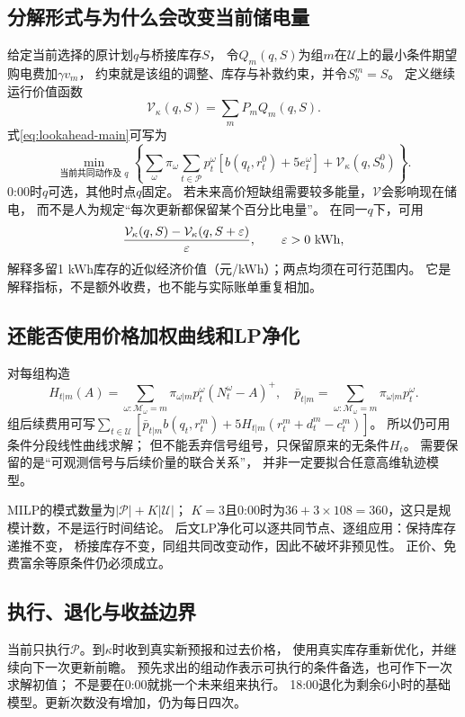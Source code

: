 \documentclass[UTF8,11pt]{ctexart}
\begin{document}
\subsection{分解形式与为什么会改变当前储电量}
给定当前选择的原计划$q$与桥接库存$S$，
令$Q_m(q,S)$为组$m$在$\mathcal U$上的最小条件期望购电费加$\gamma v_m$，
约束就是该组的调整、库存与补救约束，并令$S_b^m=S$。
定义继续运行价值函数
\begin{equation}
 \mathcal V_\kappa(q,S)=\sum_mP_m Q_m(q,S).
\end{equation}
式\eqref{eq:lookahead-main}可写为
\begin{equation}
 \min_{\text{当前共同动作及 }q}
 \left\{\sum_\omega\pi_\omega\sum_{t\in\mathcal P}
  p_t^\omega[b(q_t,r_t^0)+5e_t^\omega]
       +\mathcal V_\kappa(q,S_b^0)\right\}.
\end{equation}
0:00时$q$可选，其他时点$q$固定。
若未来高价短缺组需要较多能量，$\mathcal V$会影响现在储电，
而不是人为规定“每次更新都保留某个百分比电量”。
在同一$q$下，可用
\begin{equation}
 \frac{\mathcal V_\kappa(q,S)-\mathcal V_\kappa(q,S+\varepsilon)}
      {\varepsilon},\qquad \varepsilon>0\ {\rm kWh},
\end{equation}
解释多留1 kWh库存的近似经济价值（元/kWh）；两点均须在可行范围内。
它是解释指标，不是额外收费，也不能与实际账单重复相加。

\subsection{还能否使用价格加权曲线和LP净化}
对每组构造
\begin{equation}
 H_{t|m}(A)=\sum_{\omega:\mathcal M_\omega=m}
             \pi_{\omega|m}p_t^\omega(N_t^\omega-A)^+,\quad
 \bar p_{t|m}=\sum_{\omega:\mathcal M_\omega=m}
             \pi_{\omega|m}p_t^\omega .
\end{equation}
组后续费用可写$\sum_{t\in\mathcal U}
[\bar p_{t|m}b(q_t,r_t^m)+5H_{t|m}(r_t^m+d_t^m-c_t^m)]$。
所以仍可用条件分段线性曲线求解；
但不能丢弃信号组号，只保留原来的无条件$H_t$。
需要保留的是“可观测信号与后续价量的联合关系”，
并非一定要拟合任意高维轨迹模型。

MILP的模式数量为$|\mathcal P|+K|\mathcal U|$；
$K=3$且0:00时为$36+3\times108=360$，这只是规模计数，不是运行时间结论。
后文LP净化可以逐共同节点、逐组应用：保持库存递推不变，
桥接库存不变，同组共同改变动作，因此不破坏非预见性。
正价、免费富余等原条件仍必须成立。

\subsection{执行、退化与收益边界}
当前只执行$\mathcal P$。到$\kappa$时收到真实新预报和过去价格，
使用真实库存重新优化，并继续向下一次更新前瞻。
预先求出的组动作表示可执行的条件备选，也可作下一次求解初值；
不是要在0:00就挑一个未来组来执行。
18:00退化为剩余6小时的基础模型。更新次数没有增加，仍为每日四次。
\end{document}
